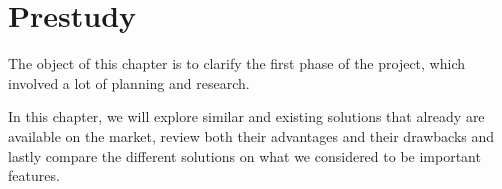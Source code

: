 \chapter{Prestudy}
\label{sec:prestudy}
The object of this chapter is to clarify the first phase of the project, which involved a lot of planning and research. 

In this chapter, we will explore similar and existing solutions that already are available on the market, review both their advantages and their drawbacks and lastly compare the different solutions on what we considered to be important features. 



\newpage




